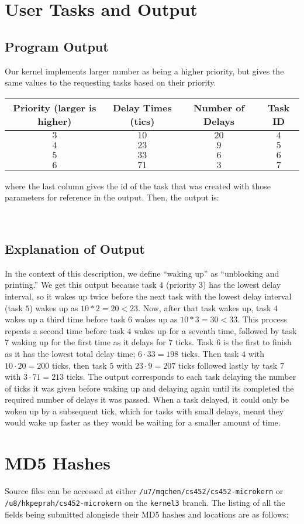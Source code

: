\documentclass[12pt]{article}
\begin{document}
\section{User Tasks and Output}
\subsection{Program Output}
Our kernel implements larger number as being a higher priority, but gives the same values to the requesting tasks based on their priority.
\begin{tabular}{|c|c|c|c|}
  \hline
  {\bf Priority (larger is higher)} & {\bf Delay Times (tics)} & {\bf Number of Delays} & {\bf Task ID} \\\hline
  $3$ & $10$ & $20$ & $4$\\\hline
  $4$ & $23$ & $9$ & $5$\\\hline
  $5$ & $33$ & $6$ & $6$\\\hline
  $6$ & $71$ & $3$ & $7$\\\hline
\end{tabular}
where the last column gives the id of the task that was created with those parameters for reference in the output.  Then, the output is:

\\[1\baselineskip]
\subsection{Explanation of Output}
In the context of this description, we define ``waking up'' as ``unblocking and printing.''  We get this output because task $4$ (priority $3$) has the lowest delay interval, so it wakes up twice before the next task with the lowest delay interval (task $5$) wakes up as $10 * 2 = 20 < 23$.  Now, after that task wakes up, task $4$ wakes up a third time before task $6$ wakes up as $10 * 3 = 30 < 33$.   This process repeats a second time before task $4$ wakes up for a seventh time, followed by task $7$ waking up for the first time as it delays for $7$ ticks.  Task $6$ is the first to finish as it has the lowest total delay time; $6\cdot 33 = 198$ ticks.  Then task $4$ with $10\cdot 20 = 200$ ticks, then task $5$ with $23\cdot 9 = 207$ ticks followed lastly by task $7$ with $3\cdot 71 = 213$ ticks.  The output corresponds to each task delaying the number of ticks it was given before waking up and delaying again until its completed the required number of delays it was passed.  When a task delayed, it could only be woken up by a subsequent tick, which for tasks with small delays, meant they would wake up faster as they would be waiting for a smaller amount of time.
\\[2\baselineskip]

\section{MD5 Hashes}
Source files can be accessed at either \texttt{/u7/mqchen/cs452/cs452-microkern} or \\ \texttt{/u8/hkpeprah/cs452-microkern} on the \texttt{kernel3} branch. The listing of all the fields being submitted alongisde their MD5 hashes and locations are as follows:

\end{document}
